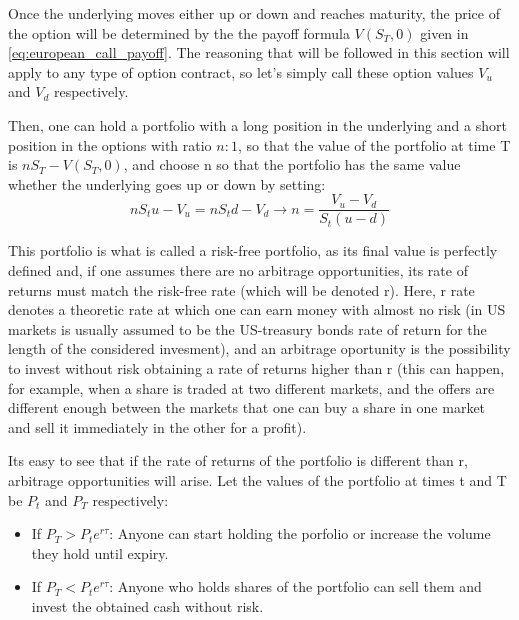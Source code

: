 \documentclass[12,twoside]{mammeTFM}
\theoremstyle{definition}
\theoremstyle{remark}
\begin{document}
Once the underlying moves either up or down and reaches maturity, the price of the option will be determined by the the payoff formula $V(S_T, 0)$ given in \ref{eq:european_call_payoff}. The reasoning that will be followed in this section will apply to any type of option contract, so let's simply call these option values $V_u$ and $V_d$ respectively.

Then, one can hold a portfolio with a long position in the underlying and a short position in the options with ratio $n:1$, so that the value of the portfolio at time T is $n S_T - V(S_T, 0)$, and choose n so that the portfolio has the same value whether the underlying goes up or down by setting:
\begin{equation}
n S_t u - V_u = n S_t d - V_d \rightarrow n = \dfrac{V_u - V_d}{S_t(u - d)}
\end{equation}

This portfolio is what is called a risk-free portfolio, as its final value is perfectly defined and, if one assumes there are no arbitrage opportunities, its rate of returns must match the risk-free rate (which will be denoted r). Here, r rate denotes a theoretic rate at which one can earn money with almost no risk (in US markets is usually assumed to be the US-treasury bonds rate of return for the length of the considered invesment), and an arbitrage oportunity is the possibility to invest without risk obtaining a rate of returns higher than r (this can happen, for example, when a share is traded at two different markets, and the offers are different enough between the markets that one can buy a share in one market and sell it immediately in the other for a profit).

Its easy to see that if the rate of returns of the portfolio is different than r, arbitrage opportunities will arise. Let the values of the portfolio at times t and T be $P_t$ and $P_T$ respectively:
\begin{itemize}
\item If $P_T > P_t e^{r\tau}$: Anyone can start holding the porfolio or increase the volume they hold until expiry.
\item If $P_T < P_t e^{r\tau}$: Anyone who holds shares of the portfolio can sell them and invest the obtained cash without risk.
\end{itemize}
\end{document}
